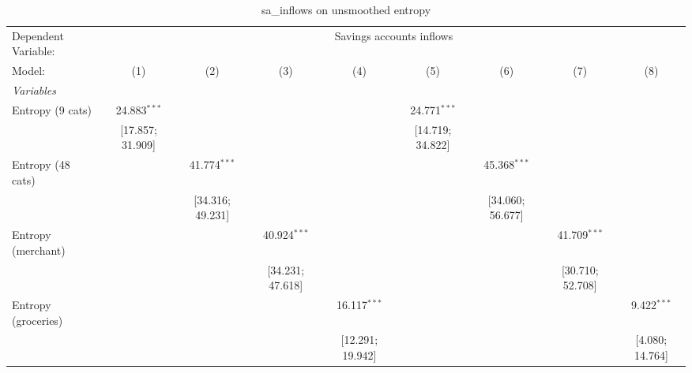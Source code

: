 
\begin{table}[htbp]
   \centering
   \tiny
   \begin{threeparttable}[b]
      \caption{\label{tab:reg_sa_inflows} sa\_inflows on unsmoothed entropy}
      \begin{tabular}{lcccccccc}
         \tabularnewline \midrule \midrule
         Dependent Variable: & \multicolumn{8}{c}{Savings accounts inflows}\\
         Model:                 & (1)               & (2)                & (3)                & (4)               & (5)                 & (6)                 & (7)                 & (8)\\  
         \midrule
         \emph{Variables}\\
         Entropy (9 cats)       & 24.883$^{***}$    &                    &                    &                   & 24.771$^{***}$      &                     &                     &   \\   
                                & [17.857; 31.909]  &                    &                    &                   & [14.719; 34.822]    &                     &                     &   \\   
         Entropy (48 cats)      &                   & 41.774$^{***}$     &                    &                   &                     & 45.368$^{***}$      &                     &   \\   
                                &                   & [34.316; 49.231]   &                    &                   &                     & [34.060; 56.677]    &                     &   \\   
         Entropy (merchant)     &                   &                    & 40.924$^{***}$     &                   &                     &                     & 41.709$^{***}$      &   \\   
                                &                   &                    & [34.231; 47.618]   &                   &                     &                     & [30.710; 52.708]    &   \\   
         Entropy (groceries)    &                   &                    &                    & 16.117$^{***}$    &                     &                     &                     & 9.422$^{***}$\\   
                                &                   &                    &                    & [12.291; 19.942]  &                     &                     &                     & [4.080; 14.764]\\   

\end{tabular}
\end{threeparttable}
\end{table}

